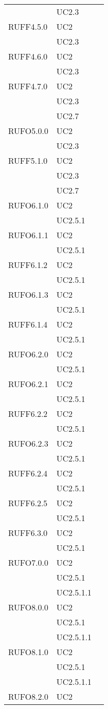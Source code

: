 \begin{center}
\begin{longtable}{lp{}l}
 & UC2.3 \\
RUFF4.5.0 & UC2 \\
 & UC2.3 \\
RUFF4.6.0 & UC2 \\
 & UC2.3 \\
RUFF4.7.0 & UC2 \\
 & UC2.3 \\
 & UC2.7 \\
RUFO5.0.0 & UC2 \\
 & UC2.3 \\
RUFF5.1.0 & UC2 \\
 & UC2.3 \\
 & UC2.7 \\
RUFO6.1.0 & UC2 \\
 & UC2.5.1 \\
RUFO6.1.1 & UC2 \\
 & UC2.5.1 \\
RUFF6.1.2 & UC2 \\
 & UC2.5.1 \\
RUFO6.1.3 & UC2 \\
 & UC2.5.1 \\
RUFF6.1.4 & UC2 \\
 & UC2.5.1 \\
RUFO6.2.0 & UC2 \\
 & UC2.5.1 \\
RUFO6.2.1 & UC2 \\
 & UC2.5.1 \\
RUFF6.2.2 & UC2 \\
 & UC2.5.1 \\
RUFO6.2.3 & UC2 \\
 & UC2.5.1 \\
RUFF6.2.4 & UC2 \\
 & UC2.5.1 \\
RUFF6.2.5 & UC2 \\
 & UC2.5.1 \\
RUFF6.3.0 & UC2 \\
 & UC2.5.1 \\
RUFO7.0.0 & UC2 \\
 & UC2.5.1 \\
 & UC2.5.1.1 \\
RUFO8.0.0 & UC2 \\
 & UC2.5.1 \\
 & UC2.5.1.1 \\
RUFO8.1.0 & UC2 \\
 & UC2.5.1 \\
 & UC2.5.1.1 \\
RUFO8.2.0 & UC2 \\

\end{longtable}
\end{center}
